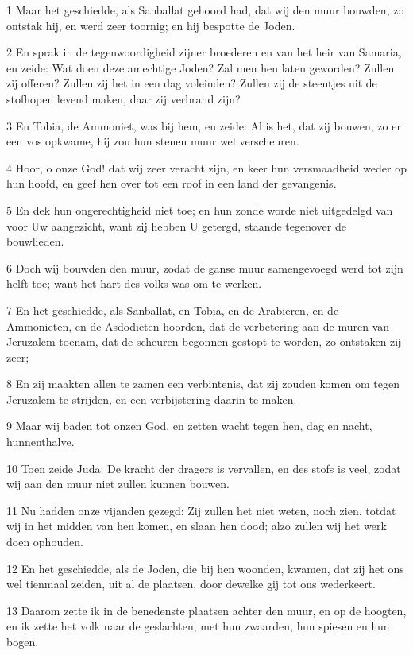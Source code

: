 \par 1 Maar het geschiedde, als Sanballat gehoord had, dat wij den muur bouwden, zo ontstak hij, en werd zeer toornig; en hij bespotte de Joden.
\par 2 En sprak in de tegenwoordigheid zijner broederen en van het heir van Samaria, en zeide: Wat doen deze amechtige Joden? Zal men hen laten geworden? Zullen zij offeren? Zullen zij het in een dag voleinden? Zullen zij de steentjes uit de stofhopen levend maken, daar zij verbrand zijn?
\par 3 En Tobia, de Ammoniet, was bij hem, en zeide: Al is het, dat zij bouwen, zo er een vos opkwame, hij zou hun stenen muur wel verscheuren.
\par 4 Hoor, o onze God! dat wij zeer veracht zijn, en keer hun versmaadheid weder op hun hoofd, en geef hen over tot een roof in een land der gevangenis.
\par 5 En dek hun ongerechtigheid niet toe; en hun zonde worde niet uitgedelgd van voor Uw aangezicht, want zij hebben U getergd, staande tegenover de bouwlieden.
\par 6 Doch wij bouwden den muur, zodat de ganse muur samengevoegd werd tot zijn helft toe; want het hart des volks was om te werken.
\par 7 En het geschiedde, als Sanballat, en Tobia, en de Arabieren, en de Ammonieten, en de Asdodieten hoorden, dat de verbetering aan de muren van Jeruzalem toenam, dat de scheuren begonnen gestopt te worden, zo ontstaken zij zeer;
\par 8 En zij maakten allen te zamen een verbintenis, dat zij zouden komen om tegen Jeruzalem te strijden, en een verbijstering daarin te maken.
\par 9 Maar wij baden tot onzen God, en zetten wacht tegen hen, dag en nacht, hunnenthalve.
\par 10 Toen zeide Juda: De kracht der dragers is vervallen, en des stofs is veel, zodat wij aan den muur niet zullen kunnen bouwen.
\par 11 Nu hadden onze vijanden gezegd: Zij zullen het niet weten, noch zien, totdat wij in het midden van hen komen, en slaan hen dood; alzo zullen wij het werk doen ophouden.
\par 12 En het geschiedde, als de Joden, die bij hen woonden, kwamen, dat zij het ons wel tienmaal zeiden, uit al de plaatsen, door dewelke gij tot ons wederkeert.
\par 13 Daarom zette ik in de benedenste plaatsen achter den muur, en op de hoogten, en ik zette het volk naar de geslachten, met hun zwaarden, hun spiesen en hun bogen.
